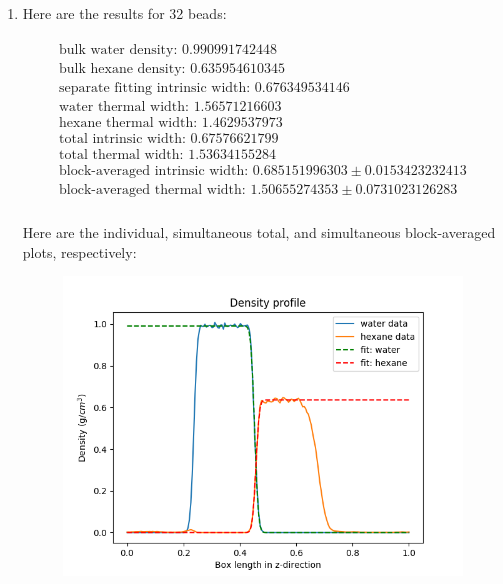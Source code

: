 \documentclass[12pt,reqno]{amsart}
\numberwithin{equation}{section}
\begin{document}
\begin{enumerate}
\item Here are the results for 32 beads:

\begin{align}
\begin{split}
\text{bulk water density: } 0.990991742448 \\
\text{bulk hexane density: } 0.635954610345 \\
\text{separate fitting intrinsic width: } 0.676349534146 \\
\text{water thermal width: } 1.56571216603 \\
\text{hexane thermal width: } 1.4629537973 \\
\text{total intrinsic width: } 0.67576621799 \\
\text{total thermal width: } 1.53634155284 \\
\text{block-averaged intrinsic width: } 0.685151996303 \pm 0.0153423232413\\
\text{block-averaged thermal width: } 1.50655274353 \pm 0.0731023126283 \\
\end{split}
\end{align} 



Here are the individual, simultaneous total, and simultaneous block-averaged plots, respectively: 

\begin{figure}[H]
\centering
\includegraphics[scale=0.6]{interface_density_profile_individualfit_NVTequil-32bead-long-noSE}
\end{figure}


\end{enumerate}
\end{document}
